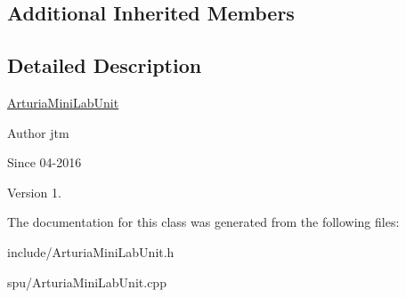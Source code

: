 \subsection*{Additional Inherited Members}


\subsection{Detailed Description}
\hyperlink{classArturiaMiniLabUnit}{Arturia\+Mini\+Lab\+Unit}

\begin{DoxyAuthor}{Author}
jtm 
\end{DoxyAuthor}
\begin{DoxySince}{Since}
04-\/2016 
\end{DoxySince}
\begin{DoxyVersion}{Version}
1. 
\end{DoxyVersion}


The documentation for this class was generated from the following files\+:\begin{DoxyCompactItemize}
\item 
include/Arturia\+Mini\+Lab\+Unit.\+h\item 
spu/Arturia\+Mini\+Lab\+Unit.\+cpp\end{DoxyCompactItemize}

